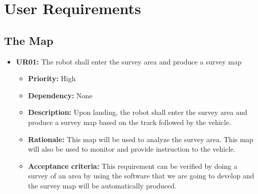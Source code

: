 \documentclass[10pt,a4paper,titlepage]{article}
\begin{document}
		\section{User Requirements}
	\subsection{The Map}
    \begin{itemize}
		\item \textbf{UR01:} The robot shall enter the survey area and produce a survey map
		\begin{itemize}
			\item \textbf{Priority:} High
            \item \textbf{Dependency:} None
			\item \textbf{Description:} Upon landing, the robot shall enter the survey area and produce a survey map based on the track followed by the vehicle. 
            \item \textbf{Rationale:} This map will be used to analyze the survey area. This map will also be used to monitor and provide instruction to the vehicle.  
            \item \textbf{Acceptance criteria:} This requirement can be verified by doing a survey of an area  by using the software that we are going to develop and the survey map will be automatically produced. 
		\end{itemize} 
	\end{itemize}
    
\end{document}
